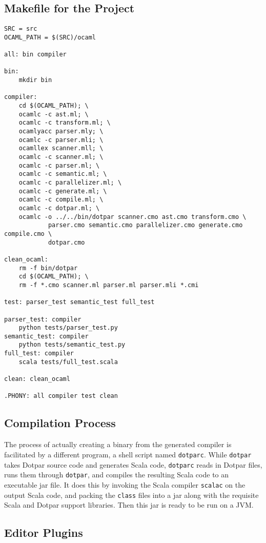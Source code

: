 \subsection{Makefile for the Project}

\begin{verbatim}
SRC = src
OCAML_PATH = $(SRC)/ocaml

all: bin compiler

bin:
	mkdir bin
	
compiler:
	cd $(OCAML_PATH); \
	ocamlc -c ast.ml; \
	ocamlc -c transform.ml; \
	ocamlyacc parser.mly; \
	ocamlc -c parser.mli; \
	ocamllex scanner.mll; \
	ocamlc -c scanner.ml; \
	ocamlc -c parser.ml; \
	ocamlc -c semantic.ml; \
	ocamlc -c parallelizer.ml; \
	ocamlc -c generate.ml; \
	ocamlc -c compile.ml; \
	ocamlc -c dotpar.ml; \
	ocamlc -o ../../bin/dotpar scanner.cmo ast.cmo transform.cmo \
			parser.cmo semantic.cmo parallelizer.cmo generate.cmo compile.cmo \
			dotpar.cmo

clean_ocaml:
	rm -f bin/dotpar
	cd $(OCAML_PATH); \
	rm -f *.cmo scanner.ml parser.ml parser.mli *.cmi

test: parser_test semantic_test full_test

parser_test: compiler
	python tests/parser_test.py
semantic_test: compiler
	python tests/semantic_test.py
full_test: compiler
	scala tests/full_test.scala

clean: clean_ocaml

.PHONY: all compiler test clean
\end{verbatim}

\subsection{Compilation Process}

The process of actually creating a binary from the generated compiler
is facilitated by a different program, a shell script named
\texttt{dotparc}. While \texttt{dotpar} takes Dotpar source code and
generates Scala code, \texttt{dotparc} reads in Dotpar files, runs
them through \texttt{dotpar}, and compiles the resulting Scala code to
an executable jar file. It does this by invoking the Scala compiler
\texttt{scalac} on the output Scala code, and packing the
\texttt{class} files into a jar along with the requisite Scala and
Dotpar support libraries. Then this jar is ready to be run on a JVM.

\subsection{Editor Plugins}

